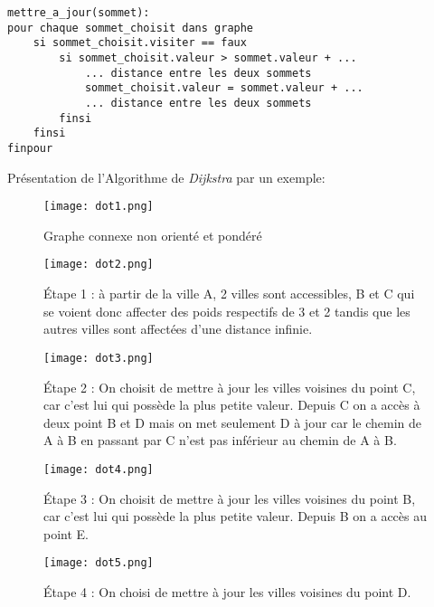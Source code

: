 			\begin{lstlisting}
mettre_a_jour(sommet):
pour chaque sommet_choisit dans graphe
    si sommet_choisit.visiter == faux
        si sommet_choisit.valeur > sommet.valeur + ...
            ... distance entre les deux sommets
		    sommet_choisit.valeur = sommet.valeur + ...
            ... distance entre les deux sommets
        finsi
	finsi
finpour
			\end{lstlisting}


Présentation de l'Algorithme de \emph{Dijkstra} par un exemple:
\begin{figure}[h]
\begin{center}
    \texttt{[image: dot1.png]} 
    \caption{Graphe connexe non orienté et pondéré}

\end{center}
\end{figure}

\begin{figure}[h]
\begin{center}
    \texttt{[image: dot2.png]} 
    \caption{Étape 1 : à partir de la ville A, 2 villes sont accessibles, B et C qui se voient donc affecter des poids respectifs de 3 et 2 tandis que les autres villes sont affectées d'une distance infinie.}
\end{center}
\end{figure}

\begin{figure}[h]
\begin{center}
    \texttt{[image: dot3.png]} 
    \caption{Étape 2 : On choisit de mettre à jour les villes voisines du point C, car c'est lui qui possède la plus petite valeur. Depuis C on a accès à deux point B et D mais on met seulement D à jour car le chemin de A à B en passant par C n'est pas inférieur au chemin de A à B.}
\end{center}
\end{figure}

\begin{figure}[h]
\begin{center}
    \texttt{[image: dot4.png]} 
    \caption{Étape 3 : On choisit de mettre à jour les villes voisines du point B, car c'est lui qui possède la plus petite valeur. Depuis B on a accès au point E.}
\end{center}
\end{figure}

\begin{figure}[h]
\begin{center}
    \texttt{[image: dot5.png]} 
    \caption{Étape 4 : On choisi de mettre à jour les villes voisines du point D.}
\end{center}
\end{figure}

